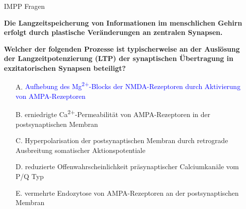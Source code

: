 \documentclass{beamer}
\begin{document}
\begin{frame}{IMPP Fragen}

\textbf{Die Langzeitspeicherung von Informationen im menschlichen Gehirn erfolgt durch plastische Veränderungen an zentralen Synapsen.}

\textbf{Welcher der folgenden Prozesse ist typischerweise an der Auslösung der Langzeitpotenzierung (LTP) der synaptischen Übertragung in exzitatorischen Synapsen beteiligt? } \\[0.2 cm]

\begin{itemize}
\item[A.] \textcolor{blue}{Aufhebung des Mg\textsuperscript{2+}-Blocks der NMDA-Rezeptoren durch Aktivierung von AMPA-Rezeptoren}
\item[B.] erniedrigte Ca\textsuperscript{2+}-Permeabilität von AMPA-Rezeptoren in der postsynaptischen Membran
\item[C.] Hyperpolarisation der postsynaptischen Membran durch retrograde Ausbreitung somatischer Aktionspotentiale
\item[D.] reduzierte Offenwahrscheinlichkeit präsynaptischer Calciumkanäle vom P/Q Typ
\item[E.] vermehrte Endozytose von AMPA-Rezeptoren an der postsynaptischen Membran

\end{itemize}

\end{frame}




\begin{frame}
\end{frame}
\end{document}
